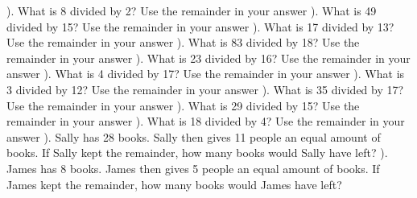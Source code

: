 \documentclass{article}%
\begin{document}
\newline%
). What is 8 divided by 2? Use the remainder in your answer%
\newline%
\newline%
). What is 49 divided by 15? Use the remainder in your answer%
\newline%
\newline%
). What is 17 divided by 13? Use the remainder in your answer%
\newline%
\newline%
). What is 83 divided by 18? Use the remainder in your answer%
\newline%
\newline%
). What is 23 divided by 16? Use the remainder in your answer%
\newline%
\newline%
). What is 4 divided by 17? Use the remainder in your answer%
\newline%
\newline%
). What is 3 divided by 12? Use the remainder in your answer%
\newline%
\newline%
). What is 35 divided by 17? Use the remainder in your answer%
\newline%
\newline%
). What is 29 divided by 15? Use the remainder in your answer%
\newline%
\newline%
). What is 18 divided by 4? Use the remainder in your answer%
\newline%
\newline%
). Sally has 28 books. Sally then gives 11 people an equal amount of books. If Sally kept the remainder, how many books would Sally have left?%
\newline%
\newline%
). James has 8 books. James then gives 5 people an equal amount of books. If James kept the remainder, how many books would James have left?%
\end{document}
